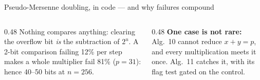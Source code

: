 \documentclass[aspectratio=169,11pt]{beamer}
\newcommand{\code}[2][]{}
\begin{document}
\begin{frame}[fragile]{Pseudo-Mersenne doubling, in code --- and why failures compound}
  \code[basicstyle=\ttfamily\fontsize{7.6}{8.8}\selectfont]{moddbl_pm.py}
  \begin{columns}[T]
    \begin{column}{0.48\textwidth}
      {\small Nothing compares anything: clearing the overflow bit \emph{is} the subtraction of $2^u$. A 2-bit comparison failing 12\% per step makes a whole multiplier fail 81\% ($p=31$): hence 40--50 bits at $n=256$.}
    \end{column}
    \begin{column}{0.48\textwidth}
      {\small \textbf{One case is not rare:} Alg.~10 cannot reduce $x+y=p$, and every multiplication meets it once. Alg.~11 catches it, with its flag test gated on the control.}
    \end{column}
  \end{columns}
\end{frame}
\end{document}

